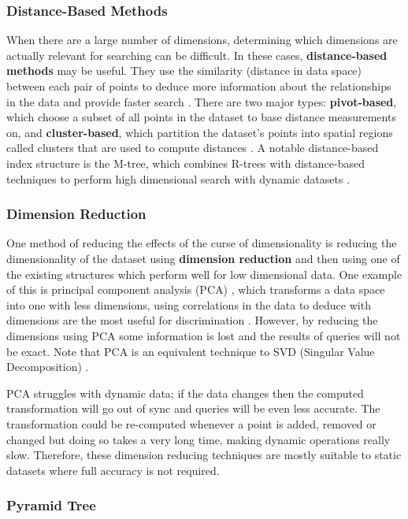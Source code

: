 \subsubsection{Distance-Based Methods}

When there are a large number of dimensions, determining which dimensions are actually relevant for searching can be difficult. In these cases, \textbf{distance-based methods} may be useful. They use the similarity (distance in data space) between each pair of points to deduce more information about the relationships in the data and provide faster search \cite{md-structures-samet}. There are two major types: \textbf{pivot-based}, which choose a subset of all points in the dataset to base distance measurements on, and \textbf{cluster-based}, which partition the dataset's points into spatial regions called clusters that are used to compute distances \cite{md-structures-samet}. A notable distance-based index structure is the M-tree, which combines R-trees with distance-based techniques to perform high dimensional search with dynamic datasets \cite{m-tree}.

\subsubsection{Dimension Reduction}

One method of reducing the effects of the curse of dimensionality is reducing the dimensionality of the dataset using \textbf{dimension reduction} and then using one of the existing structures which perform well for low dimensional data. One example of this is principal component analysis (PCA) \cite{pca}, which transforms a data space into one with less dimensions, using correlations in the data to deduce with dimensions are the most useful for discrimination \cite{pca}. However, by reducing the dimensions using PCA some information is lost and the results of queries will not be exact. Note that PCA is an equivalent technique to SVD (Singular Value Decomposition)  \cite{md-structures-samet}.

PCA struggles with dynamic data; if the data changes then the computed transformation will go out of sync and queries will be even less accurate. The transformation could be re-computed whenever a point is added, removed or changed but doing so takes a very long time, making dynamic operations really slow. Therefore, these dimension reducing techniques are mostly suitable to static datasets where full accuracy is not required.

\subsubsection{Pyramid Tree}
\label{sec:pyramid-tree}

